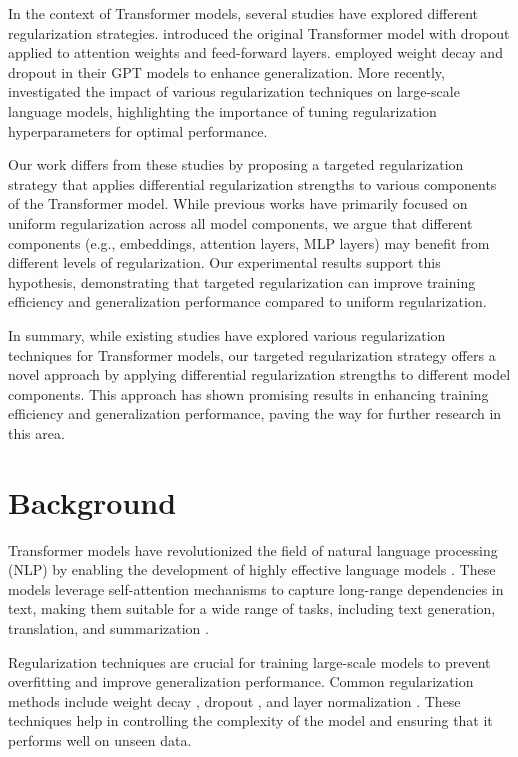 \documentclass{article} %
\begin{document}
In the context of Transformer models, several studies have explored different regularization strategies. \citet{vaswani2017attention} introduced the original Transformer model with dropout applied to attention weights and feed-forward layers. \citet{radford2019language} employed weight decay and dropout in their GPT models to enhance generalization. More recently, \citet{gpt4} investigated the impact of various regularization techniques on large-scale language models, highlighting the importance of tuning regularization hyperparameters for optimal performance.

Our work differs from these studies by proposing a targeted regularization strategy that applies differential regularization strengths to various components of the Transformer model. While previous works have primarily focused on uniform regularization across all model components, we argue that different components (e.g., embeddings, attention layers, MLP layers) may benefit from different levels of regularization. Our experimental results support this hypothesis, demonstrating that targeted regularization can improve training efficiency and generalization performance compared to uniform regularization.

In summary, while existing studies have explored various regularization techniques for Transformer models, our targeted regularization strategy offers a novel approach by applying differential regularization strengths to different model components. This approach has shown promising results in enhancing training efficiency and generalization performance, paving the way for further research in this area.

\section{Background}
\label{sec:background}

Transformer models have revolutionized the field of natural language processing (NLP) by enabling the development of highly effective language models \citep{vaswani2017attention}. These models leverage self-attention mechanisms to capture long-range dependencies in text, making them suitable for a wide range of tasks, including text generation, translation, and summarization \citep{radford2019language}.

Regularization techniques are crucial for training large-scale models to prevent overfitting and improve generalization performance. Common regularization methods include weight decay \citep{Malthouse1998ShrinkageEA}, dropout \citep{Srivastava2014DropoutAS}, and layer normalization \citep{ba2016layer}. These techniques help in controlling the complexity of the model and ensuring that it performs well on unseen data.
\end{document}
